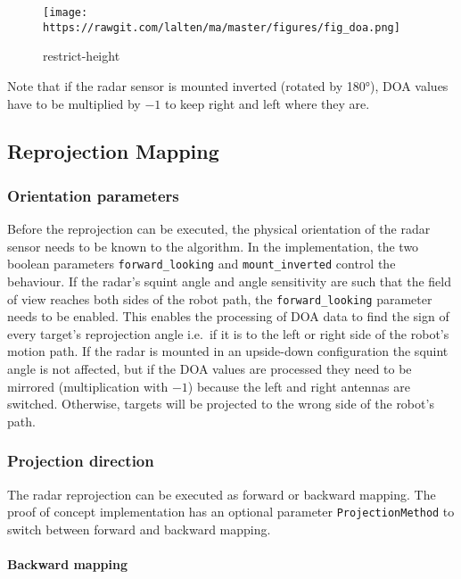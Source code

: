 \begin{figure}
\centering
\texttt{[image: https://rawgit.com/lalten/ma/master/figures/fig\_doa.png]}
\caption{restrict-height}
\end{figure}

Note that if the radar sensor is mounted inverted (rotated by 180°), DOA
values have to be multiplied by \(-1\) to keep right and left where they
are.

\subsection{Reprojection Mapping}\label{reprojection-mapping}

\subsubsection{Orientation parameters}\label{orientation-parameters}

Before the reprojection can be executed, the physical orientation of the
radar sensor needs to be known to the algorithm. In the implementation,
the two boolean parameters \texttt{forward\_looking} and
\texttt{mount\_inverted} control the behaviour. If the radar's squint
angle and angle sensitivity are such that the field of view reaches both
sides of the robot path, the \texttt{forward\_looking} parameter needs
to be enabled. This enables the processing of DOA data to find the sign
of every target's reprojection angle i.e.~if it is to the left or right
side of the robot's motion path. If the radar is mounted in an
upside-down configuration the squint angle is not affected, but if the
DOA values are processed they need to be mirrored (multiplication with
\(-1\)) because the left and right antennas are switched. Otherwise,
targets will be projected to the wrong side of the robot's path.

\subsubsection{Projection direction}\label{projection-direction}

The radar reprojection can be executed as forward or backward mapping.
The proof of concept implementation has an optional parameter
\texttt{ProjectionMethod} to switch between forward and backward
mapping.

\paragraph{Backward mapping}\label{backward-mapping}

